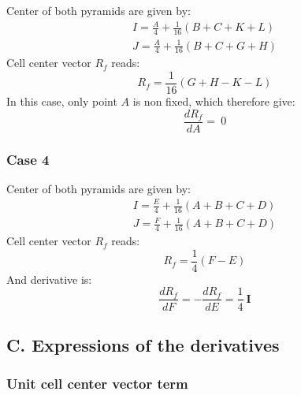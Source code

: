 \documentclass[11pt]{article}
\begin{document}
Center of both pyramids are given by:
\begin{subequations}
\begin{gather}
I = \frac{A}{4} + \frac{1}{16} (B + C + K + L) \\
J = \frac{A}{4} + \frac{1}{16} (B + C + G + H)
\end{gather}
\end{subequations} 
Cell center vector $R_f$ reads:
\begin{equation}
R_f = \frac{1}{16} ( G + H - K - L)
\end{equation}
In this case, only point $A$ is non fixed, which therefore give:
\begin{equation}
\frac{d R_f}{d A} = \ 0 
\end{equation}


\subsubsection*{Case 4}

Center of both pyramids are given by:
\begin{subequations}
\begin{gather}
I = \frac{E}{4} + \frac{1}{16} (A + B + C + D) \\
J = \frac{F}{4} + \frac{1}{16} (A + B + C + D)
\end{gather}
\end{subequations} 
Cell center vector $R_f$ reads:
\begin{equation}
R_f = \frac{1}{4} (F-E)
\end{equation}
And derivative is:
\begin{equation}
\frac{d R_f}{d F} = - \frac{d R_f}{d E} = \frac{1}{4}\ \boldsymbol{I}
\end{equation}



\subsection*{C. Expressions of the derivatives}

\subsubsection*{Unit cell center vector term}
\end{document}
